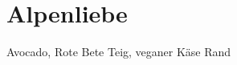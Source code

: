 \documentclass{article}
\begin{document}
\section*{Alpenliebe}
Avocado, Rote Bete Teig, veganer Käse Rand
\end{document}
